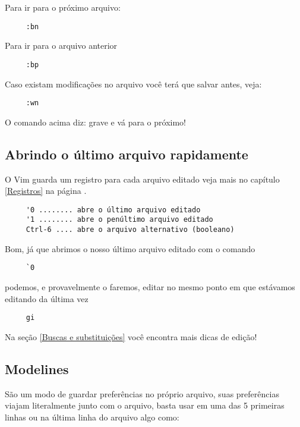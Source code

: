 Para ir para o próximo arquivo:

\begin{verbatim}
     :bn
\end{verbatim}

Para ir para o arquivo anterior

\begin{verbatim}
     :bp
\end{verbatim}

Caso existam modificações no arquivo você terá que salvar antes, veja:

\begin{verbatim}
     :wn
\end{verbatim}

O comando acima diz: grave e vá para o próximo!


\subsection{Abrindo o último arquivo rapidamente}
O Vim guarda um registro para cada arquivo editado veja
mais no capítulo \ref{Registros} na página \pageref{Registros}.

\begin{verbatim}
     '0 ........ abre o último arquivo editado
     '1 ........ abre o penúltimo arquivo editado
     Ctrl-6 .... abre o arquivo alternativo (booleano)
\end{verbatim}

Bom, já que abrimos o nosso último arquivo editado com o comando

\begin{verbatim}
     `0
\end{verbatim}

podemos, e provavelmente o faremos, editar no mesmo ponto em que estávamos
editando da última vez

\begin{verbatim}
     gi
\end{verbatim}

Na seção \ref{Buscas e substituições} você encontra mais dicas de edição!


\subsection{Modelines}\label{sec:Modelines}

São um modo de guardar preferências no próprio arquivo, suas
preferências viajam literalmente junto com o arquivo, basta usar em
uma das 5 primeiras linhas ou na última linha do arquivo algo
como:

